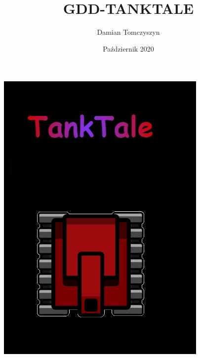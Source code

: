 \documentclass{article}
\title{GDD-TANKTALE}
\author{Damian Tomczyszyn}
\date{Październik 2020}
\begin{document}
\maketitle

\centering
\includegraphics[scale=0.6,]{TT-logo.jpg}
\end{document}
